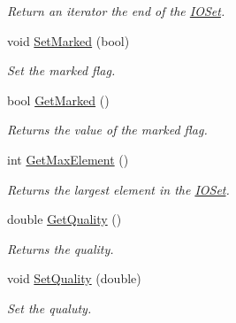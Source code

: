 \begin{DoxyCompactItemize}
\begin{DoxyCompactList}\small\item\em Return an iterator the end of the \hyperlink{class_i_o_set}{IOSet}. \item\end{DoxyCompactList}\item 
\hypertarget{class_i_o_set_adf83505da322e2b78f2d80605e777de6}{
void \hyperlink{class_i_o_set_adf83505da322e2b78f2d80605e777de6}{SetMarked} (bool)}
\label{class_i_o_set_adf83505da322e2b78f2d80605e777de6}

\begin{DoxyCompactList}\small\item\em Set the marked flag. \item\end{DoxyCompactList}\item 
\hypertarget{class_i_o_set_a09d93330dd883be32508b7858c1ec3df}{
bool \hyperlink{class_i_o_set_a09d93330dd883be32508b7858c1ec3df}{GetMarked} ()}
\label{class_i_o_set_a09d93330dd883be32508b7858c1ec3df}

\begin{DoxyCompactList}\small\item\em Returns the value of the marked flag. \item\end{DoxyCompactList}\item 
\hypertarget{class_i_o_set_a99b1856d8b320d7cf3bc3d5e1352d8c6}{
int \hyperlink{class_i_o_set_a99b1856d8b320d7cf3bc3d5e1352d8c6}{GetMaxElement} ()}
\label{class_i_o_set_a99b1856d8b320d7cf3bc3d5e1352d8c6}

\begin{DoxyCompactList}\small\item\em Returns the largest element in the \hyperlink{class_i_o_set}{IOSet}. \item\end{DoxyCompactList}\item 
\hypertarget{class_i_o_set_a7a12cfa9ea07e4a027a53c3556280569}{
double \hyperlink{class_i_o_set_a7a12cfa9ea07e4a027a53c3556280569}{GetQuality} ()}
\label{class_i_o_set_a7a12cfa9ea07e4a027a53c3556280569}

\begin{DoxyCompactList}\small\item\em Returns the quality. \item\end{DoxyCompactList}\item 
\hypertarget{class_i_o_set_a4bacb2fdc24b9e399b03221264a22793}{
void \hyperlink{class_i_o_set_a4bacb2fdc24b9e399b03221264a22793}{SetQuality} (double)}
\label{class_i_o_set_a4bacb2fdc24b9e399b03221264a22793}

\begin{DoxyCompactList}\small\item\em Set the qualuty. \item\end{DoxyCompactList}\end{DoxyCompactItemize}
